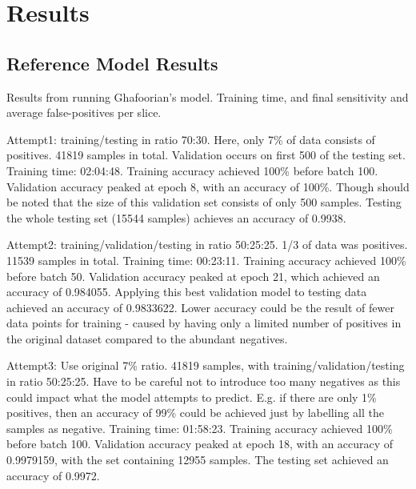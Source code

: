 %
%

\chapter{Results}\label{results}

\citep{AdamsH.H.Hieab2013RMfD}

\section{Reference Model Results}

Results from running Ghafoorian's model. Training time, and final sensitivity and average false-positives per slice.


Attempt1: training/testing in ratio 70:30. Here, only 7\% of data consists of positives. 41819 samples in total. Validation occurs on first 500 of the testing set. Training time: 02:04:48.
Training accuracy achieved 100\% before batch 100. Validation accuracy peaked at epoch 8, with an accuracy of 100\%. Though should be noted that the size of this validation set consists of only 500 samples. Testing the whole testing set (15544 samples) achieves an accuracy of 0.9938.

Attempt2: training/validation/testing in ratio 50:25:25. 1/3 of data was positives. 11539 samples in total. Training time: 00:23:11.
Training accuracy achieved 100\% before batch 50. Validation accuracy peaked at epoch 21, which achieved an accuracy of 0.984055. Applying this best validation model to testing data achieved an accuracy of 0.9833622. Lower accuracy could be the result of fewer data points for training - caused by having only a limited number of positives in the original dataset compared to the abundant negatives.

Attempt3: Use original 7\% ratio. 41819 samples, with training/validation/testing in ratio 50:25:25. Have to be careful not to introduce too many negatives as this could impact what the model attempts to predict. E.g. if there are only 1\% positives, then an accuracy of 99\% could be achieved just by labelling all the samples as negative. Training time: 01:58:23.
Training accuracy achieved 100\% before batch 100. Validation accuracy peaked at epoch 18, with an accuracy of 0.9979159, with the set containing 12955 samples. The testing set achieved an accuracy of 0.9972.




%